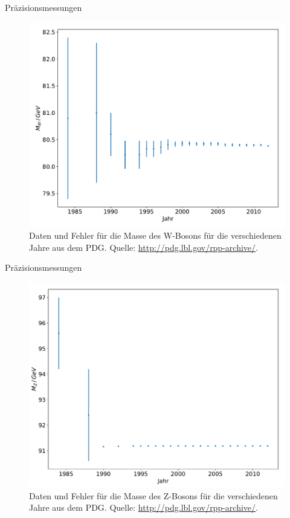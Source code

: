 \documentclass[aspectratio=1610, professionalfonts, 10pt]{beamer}
\begin{document}
\begin{frame}{Präzisionsmessungen}
		\begin{figure}
	  		\centering
			\includegraphics[width=0.9\textheight]{ressources/mw.pdf}
			\caption{Daten und Fehler für die Masse des W-Bosons für die verschiedenen Jahre aus dem PDG. Quelle: \url{http://pdg.lbl.gov/rpp-archive/}.}
	  		\label{fig:sad}
		\end{figure}
\end{frame}

\begin{frame}{Präzisionsmessungen}
		\begin{figure}
	  		\centering
			\includegraphics[width=0.9\textheight]{ressources/mz.pdf}
			\caption{Daten und Fehler für die Masse des Z-Bosons für die verschiedenen Jahre aus dem PDG. Quelle: \url{http://pdg.lbl.gov/rpp-archive/}.}
	  		\label{fig:sad}
		\end{figure}
\end{frame}
\end{document}
